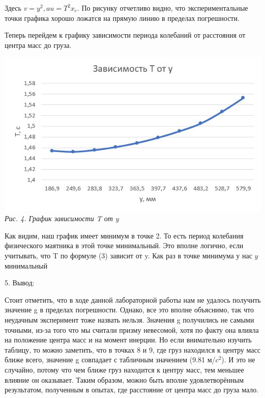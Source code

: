 \documentclass[12pt, a4paper]{article}
\begin{document}
            Здесь $v = y^2, a u = T^2x_c.$
            По рисунку отчетливо видно, что экспериментальные точки графика хорошо ложатся на прямую линию в пределах погрешности.

            Теперь перейдем к графику зависимости периода колебаний от расстояния от центра масс до груза.

            \begin{minipage}[c]{\textwidth}
                \begin{center}
                    \includegraphics[scale=1]{Pics/picture4.jpg} \\
                    \textit{\textcolor[HTML]{000000}{Рис. 4. График зависимости T от y}}
                \end{center}
            \end{minipage}
            \vspace*{0.3cm}
            
            Как видим, наш график имеет минимум в точке 2. То есть период колебания физического маятника в этой точке минимальный.
            Это вполне логично, если учитывать, что T по формуле (3) зависит от y. 
            Как раз в точке минимума у нас $y$ минимальный
            \vspace*{0.3cm}

    
            {\Large 5. Вывод: \\}

            Стоит отметить, что в ходе данной лабораторной работы нам не удалось получить значение g
            в пределах погрешности. Однако, все это вполне объяснимо, так что неудачным эксперимент
            тоже назвать нельзя. Значения g получились не самыми точными, из-за того что мы считали 
            призму невесомой, хотя по факту она влияла на положение центра масс и на момент инерции.
            Но если внимательно изучить таблицу, то можно заметить, что в точках 8 и 9, где груз находился
            к центру масс ближе всего, значение g совпадает с табличным значением (9.81 м/$c^2$). И это не
            случайно, потому что чем ближе груз находится к центру масс, тем меньшее влияние он оказывает.
            Таким образом, можно быть вполне удовлетворённым результатом, полученным в опытах, где расстояние
            от центра масс до груза мало.    
\end{document}

